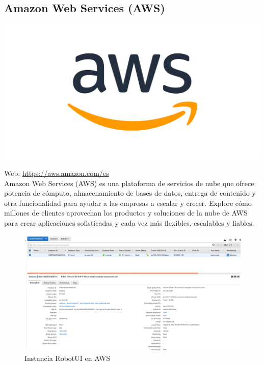 \subsection{Amazon Web Services (AWS) }

\begin{center}\includegraphics[scale=0.25]{imagenes/aws_logo.png}\end{center}

Web: \url{https://aws.amazon.com/es}\\

Amazon Web Services (AWS) es una plataforma de servicios de nube que ofrece potencia de cómputo, almacenamiento de bases de datos, entrega de contenido y otra funcionalidad para ayudar a las empresas a escalar y crecer. Explore cómo millones de clientes aprovechan los productos y soluciones de la nube de AWS para crear aplicaciones sofisticadas y cada vez más flexibles, escalables y fiables.\\

\begin{figure}
\includegraphics[scale=0.3]{imagenes/aws_instance.png}
\caption{Instancia RobotUI en AWS}
\end{figure}


